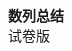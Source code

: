 \documentclass[zihao=-4]{exam-zh}
\begin{document}
\begin{center}
  {\bfseries 数列总结}\\[4pt]
  { 试卷版}
\end{center}

\end{document}
